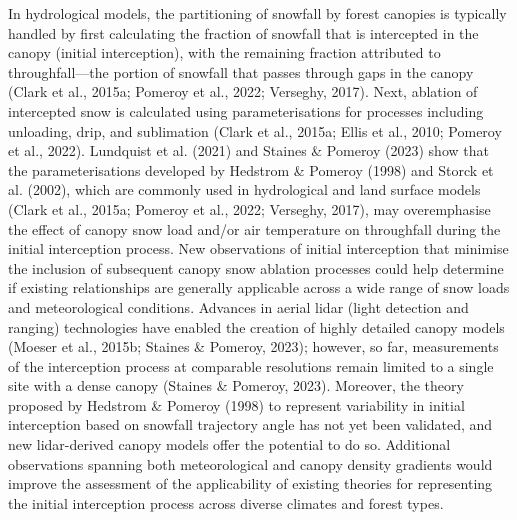 \documentclass[
  letterpaper,
]{tex/uofsthesis-cs}
\begin{document}
In hydrological models, the partitioning of snowfall by forest canopies
is typically handled by first calculating the fraction of snowfall that
is intercepted in the canopy (initial interception), with the remaining
fraction attributed to throughfall---the portion of snowfall that passes
through gaps in the canopy (Clark et al., 2015a; Pomeroy et al., 2022;
Verseghy, 2017). Next, ablation of intercepted snow is calculated using
parameterisations for processes including unloading, drip, and
sublimation (Clark et al., 2015a; Ellis et al., 2010; Pomeroy et al.,
2022). Lundquist et al. (2021) and Staines \& Pomeroy (2023) show that
the parameterisations developed by Hedstrom \& Pomeroy (1998) and Storck
et al. (2002), which are commonly used in hydrological and land surface
models (Clark et al., 2015a; Pomeroy et al., 2022; Verseghy, 2017), may
overemphasise the effect of canopy snow load and/or air temperature on
throughfall during the initial interception process. New observations of
initial interception that minimise the inclusion of subsequent canopy
snow ablation processes could help determine if existing relationships
are generally applicable across a wide range of snow loads and
meteorological conditions. Advances in aerial lidar (light detection and
ranging) technologies have enabled the creation of highly detailed
canopy models (Moeser et al., 2015b; Staines \& Pomeroy, 2023); however,
so far, measurements of the interception process at comparable
resolutions remain limited to a single site with a dense canopy (Staines
\& Pomeroy, 2023). Moreover, the theory proposed by Hedstrom \& Pomeroy
(1998) to represent variability in initial interception based on
snowfall trajectory angle has not yet been validated, and new
lidar-derived canopy models offer the potential to do so. Additional
observations spanning both meteorological and canopy density gradients
would improve the assessment of the applicability of existing theories
for representing the initial interception process across diverse
climates and forest types.
\end{document}
